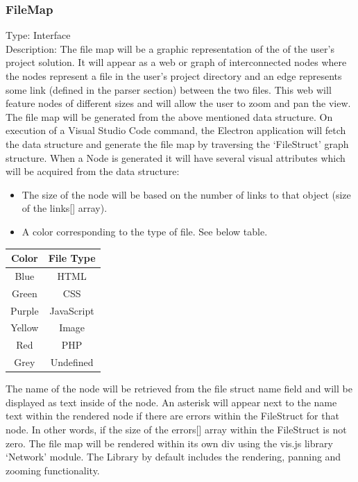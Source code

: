 \documentclass[letterpaper,10pt,titlepage,draftclsnofoot,onecolumn,onesided] {IEEEtran}
\begin{document}
	\subsubsection{FileMap}
	Type: Interface
	\\
	Description: 
	The file map will be a graphic representation of the of the user's project solution. 
	It will appear as a web or graph of interconnected nodes where the nodes represent a file in the user's project directory and an edge represents some link (defined in the parser section) between the two files. 
	This web will feature nodes of different sizes and will allow the user to zoom and pan the view.
	The file map will be generated from the above mentioned data structure. 
	On execution of a Visual Studio Code command, the Electron application will fetch the data structure and generate the file map by traversing the ‘FileStruct' graph structure. 
	When a Node is generated it will have several visual attributes which will be acquired from the data structure:
	\\
	\begin{itemize}
	\item The size of the node will be based on the number of links to that object (size of the links[] array). 
	\item A color corresponding to the type of file. See below table.
	\end{itemize}
	\begin{tabular}{| c | c |}
	\hline
	Color & File Type\\
	\hline
	Blue & HTML \\
	Green & CSS \\
	Purple & JavaScript \\
	Yellow & Image \\
	Red & PHP \\
	Grey & Undefined \\
	\hline
	\end{tabular}
	
	The name of the node will be retrieved from the file struct name field and will be displayed as text inside of the node.
	An asterisk will appear next to the name text within the rendered node if there are errors within the FileStruct for that node. In other words, if the size of the errors[] array within the FileStruct is not zero.
	The file map will be rendered within its own div using the vis.js library ‘Network' module. The Library by default includes the rendering, panning and zooming functionality.
	
\end{document}
